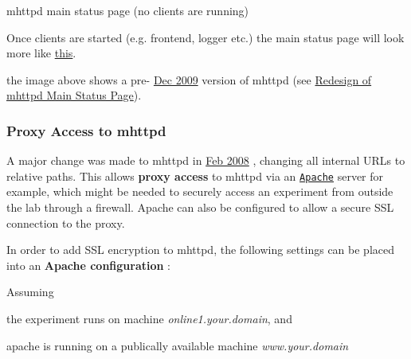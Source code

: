 \label{RC_mhttpd_utility_RC_mhttpd_minimal_status_page}
\hypertarget{RC_mhttpd_utility_RC_mhttpd_minimal_status_page}{}
 \begin{center} mhttpd main status page (no clients are running) \par
\par
\par
   \end{center}  \par


Once clients are started (e.g. frontend, logger etc.) the main status page will look more like \hyperlink{RC_mhttpd_Main_Status_page_RC_mhttpd_msp_customized}{this}.

the image above shows a pre-\/ \hyperlink{NDF_ndf_dec_2009}{Dec 2009} version of mhttpd (see \hyperlink{RC_mhttpd_status_page_redesign}{Redesign of mhttpd Main Status Page}).

\par
 

 \par


\label{RC_mhttpd_utility_idx_mhttpd_proxy-access}
\hypertarget{RC_mhttpd_utility_idx_mhttpd_proxy-access}{}
 \label{RC_mhttpd_utility_idx_access-control_mhttpd-proxy}
\hypertarget{RC_mhttpd_utility_idx_access-control_mhttpd-proxy}{}
 \label{RC_mhttpd_utility_idx_Apache}
\hypertarget{RC_mhttpd_utility_idx_Apache}{}
 \hypertarget{RC_mhttpd_utility_RC_mhttpd_proxy}{}\subsubsection{Proxy Access to mhttpd}\label{RC_mhttpd_utility_RC_mhttpd_proxy}
A major change was made to mhttpd in \hyperlink{NDF_ndf_feb_2008}{Feb 2008} , changing all internal URLs to relative paths. This allows {\bfseries proxy access} to mhttpd via an \href{http://apache.org/}{\tt Apache} server for example, which might be needed to securely access an experiment from outside the lab through a firewall. Apache can also be configured to allow a secure SSL connection to the proxy.

In order to add SSL encryption to mhttpd, the following settings can be placed into an {\bfseries Apache configuration} : \par
 Assuming
\begin{DoxyItemize}
\item the experiment runs on machine {\itshape online1.your.domain\/}, and
\item apache is running on a publically available machine {\itshape www.your.domain\/} \par

\end{DoxyItemize}


